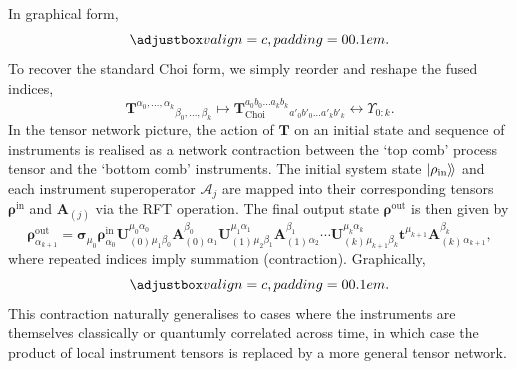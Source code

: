 In graphical form,
\begin{equation*}
    \valignbox{}.
\end{equation*}
To recover the standard Choi form, we simply reorder and reshape the fused indices,
\begin{equation}\label{eq:pt-tensor-to-choi}
    \mathbf{T}^{\alpha_0,\dots,\alpha_k}{}_{\beta_0,\dots,\beta_k} \mapsto \mathbf{T}_{\mathrm{Choi}}^{a_0b_0\dots a_kb_k}{}_{a'_0b'_0\dots a'_kb'_k} \longleftrightarrow \Upsilon_{0:k}.
\end{equation}
In the tensor network picture, the action of \(\mathbf{T}\) on an initial state and sequence of instruments is realised as a network contraction between the `top comb' process tensor and the `bottom comb' instruments. The initial system state \(| \rho_\mathrm{in} \rangle \! \rangle\) and each instrument superoperator \(\mathcal{A}_j\) are mapped into their corresponding tensors \(\pmb{\rho}^\mathrm{in}\) and \(\mathbf{A}_{(j)}\) via the RFT operation. The final output state \(\pmb{\rho}^\mathrm{out}\) is then given by
\begin{equation}
    \pmb{\rho}^\mathrm{out}_{\alpha_{k+1}} = \pmb{\sigma}_{\mu_0}\pmb{\rho}^\mathrm{in}_{\alpha_0}\mathbf{U}_{(0)}^{\mu_0\alpha_0}{}_{\mu_1\beta_0}\mathbf{A}_{(0)}^{\beta_0}{}_{\alpha_1}\mathbf{U}_{(1)}^{\mu_1\alpha_1}{}_{\mu_2\beta_1}\mathbf{A}_{(1)}^{\beta_1}{}_{\alpha_2}\cdots\mathbf{U}_{(k)}^{\mu_k\alpha_k}{}_{\mu_{k+1}\beta_k}\mathbf{t}^{\mu_{k+1}}\mathbf{A}_{(k)}^{\beta_k}{}_{\alpha_{k+1}},
\end{equation}
where repeated indices imply summation (contraction). Graphically,
\begin{equation*}
    \valignbox{}.
\end{equation*}
This contraction naturally generalises to cases where the instruments are themselves classically or quantumly correlated across time, in which case the product of local instrument tensors is replaced by a more general tensor network.

